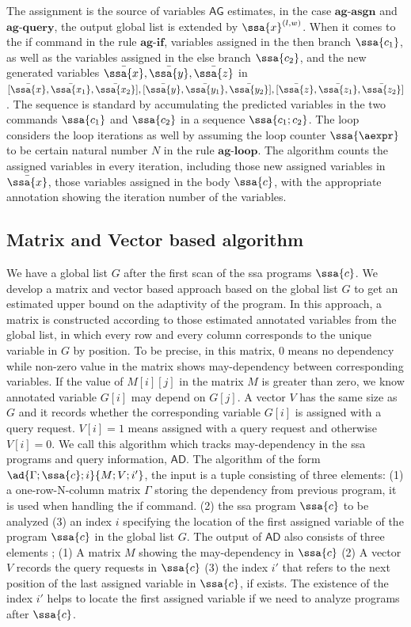 The assignment is the source of variables $\mathsf{AG}$ estimates, in the case $\textbf{ag-asgn}$ and $\textbf{ag-query}$, the output global list is extended by $\ssa{x}^{(l,w)}$. When it comes to the if command in the rule $\textbf{ag-if}$, variables assigned in the then branch $\ssa{c_1}$, as well as the variables assigned in the else branch $\ssa{c_2}$, and the new generated variables $\bar{\ssa{x}},\bar{\ssa{y}},\bar{\ssa{z}}$ in $ [ \bar{\ssa{x}}, \bar{\ssa{x_1}}, \bar{\ssa{x_2}}] ,[ \bar{\ssa{y}}, \bar{\ssa{y_1}}, \bar{\ssa{y_2}}],[ \bar{\ssa{z}}, \bar{\ssa{z_1}}, \bar{\ssa{z_2}}]$. The sequence is standard by accumulating the predicted variables in the two commands $\ssa{c_1}$ and $\ssa{c_2}$ in a sequence $\ssa{c_1;c_2}$. The loop considers the loop iterations as well by assuming the loop counter $\ssa{\aexpr}$ to be certain natural number $N$ in the rule $\textbf{ag-loop}$. The algorithm counts the assigned variables in every iteration, including those new assigned variables in $\bar{\ssa{x}}$, those variables assigned in the body $\ssa{c}$, with the appropriate annotation showing the iteration number of the variables.      


\subsection{Matrix and Vector based algorithm}
We have a global list $G$ after the first scan of the ssa programs $\ssa{c}$. We develop a matrix and vector based approach based on the global list $G$ to get an estimated upper bound on the adaptivity of the program.  In this approach, a matrix is constructed according to those estimated annotated variables from the global list, in which every row and every column corresponds to the unique variable in $G$ by position. To be precise, in this matrix, $0$ means no dependency while non-zero value in the matrix shows may-dependency between corresponding variables. If the value of $M[i][j]$ in the matrix $M$ is greater than zero, we know annotated variable $G[i]$ may depend on $G[j]$. A vector $V$ has the same size as $G$ and it records whether the corresponding variable $G[i]$ is assigned with a query request. $V[i] =1$ means assigned with a query request and  otherwise $V[i]=0$. We call this algorithm which tracks may-dependency in the ssa programs and query information, $\mathsf{AD}$. The algorithm of the form $ \ad{\Gamma; \ssa{c} ;i }{ M; V;  i' } $, the input is a tuple consisting of three elements: (1) a one-row-N-column matrix $\Gamma$ storing the dependency from previous program, it is used when handling the if command. (2) the ssa program $\ssa{c}$ to be analyzed (3) an index $i$ specifying the location of the first assigned variable of the program $\ssa{c}$ in the global list $G$. The output of $\mathsf{AD}$ also consists of three elements ; (1) A matrix $M$ showing the may-dependency in $\ssa{c}$ (2) A vector $V$ records the query requests in $\ssa{c}$ (3) the index $i'$ that refers to the next position of the last assigned variable in $\ssa{c}$, if exists. The existence of the index $i'$ helps to locate the first assigned variable if we need to analyze programs after $\ssa{c}$.  

